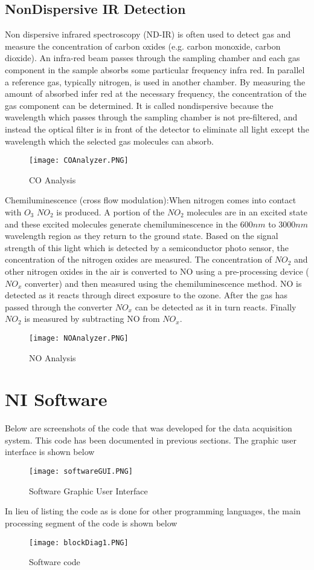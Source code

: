 \subsection{NonDispersive IR Detection}
Non dispersive infrared spectroscopy (ND-IR) is often used to detect gas and measure the concentration of carbon oxides (e.g. carbon monoxide, carbon dioxide).  An infra-red beam passes through the sampling chamber and each gas component in the sample absorbs some particular frequency infra red. In parallel a reference gas, typically nitrogen, is used in another chamber. By measuring the amount of absorbed infer red at the necessary frequency, the concentration of the gas component can be determined. It is called nondispersive because the wavelength which passes through the sampling chamber is not pre-filtered,  and instead the optical filter is in front of the detector to eliminate all light except the wavelength which the selected gas molecules can absorb.
\begin{figure}[h!]
    \centering
        \texttt{[image: COAnalyzer.PNG]}
        \caption{CO Analysis}
    \label{f:COAnalyzer}
\end{figure}
Chemiluminescence (cross flow modulation):When nitrogen comes into contact with $O_3$ $NO_2$ is produced. A portion of the $NO_2$ molecules are in an excited state and these excited molecules generate chemiluminescence in the $600nm$ to $3000nm$ wavelength region as they return to the ground state. Based on the signal strength of this light which is detected by a semiconductor photo sensor, the concentration of the nitrogen oxides are measured. The concentration of $NO_2$ and other nitrogen oxides in the air is converted to NO using a pre-processing device ($NO_x$ converter) and then measured using the chemiluminescence method. NO is detected as it reacts through direct exposure to the ozone. After the gas has passed through the converter $NO_x$ can be detected as it in turn reacts. Finally $NO_2$ is measured by subtracting NO from $NO_x$.
\begin{figure}[h!]
    \centering
        \texttt{[image: NOAnalyzer.PNG]}
        \caption{NO Analysis}
    \label{f:NOAnalyzer}
\end{figure}
\section{NI Software}
Below are screenshots of the code that was developed for the data acquisition system. This code has been documented in previous sections. The graphic user interface is shown below
\begin{figure}[h!]
    \centering
        \texttt{[image: softwareGUI.PNG]}
        \caption{Software Graphic User Interface}
    \label{f:softwareGUI}
\end{figure}
In lieu of listing the code as is done for other programming languages, the main processing segment of the code is shown below
\begin{figure}[h!]
    \centering
        \texttt{[image: blockDiag1.PNG]}
        \caption{Software code}
    \label{f:blockDiag1}
\end{figure} 